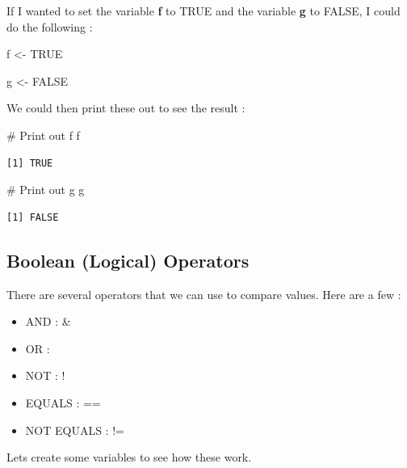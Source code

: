 \documentclass[
  letterpaper,
  DIV=11,
  numbers=noendperiod]{scrreprt}
\newenvironment{Shaded}{\begin{snugshade}}{\end{snugshade}}
\newcommand{\CommentTok}[1]{\textcolor[rgb]{0.37,0.37,0.37}{#1}}
\newcommand{\ConstantTok}[1]{\textcolor[rgb]{0.56,0.35,0.01}{#1}}
\newcommand{\NormalTok}[1]{\textcolor[rgb]{0.00,0.23,0.31}{#1}}
\newcommand{\OtherTok}[1]{\textcolor[rgb]{0.00,0.23,0.31}{#1}}
\providecommand{\tightlist}{%
  \setlength{\itemsep}{0pt}\setlength{\parskip}{0pt}}\usepackage{longtable,booktabs,array}
\begin{document}
If I wanted to set the variable \textbf{f} to TRUE and the variable
\textbf{g} to FALSE, I could do the following :

\begin{Shaded}
\begin{Highlighting}[]
\NormalTok{f }\OtherTok{\textless{}{-}} \ConstantTok{TRUE}

\NormalTok{g }\OtherTok{\textless{}{-}} \ConstantTok{FALSE}
\end{Highlighting}
\end{Shaded}

We could then print these out to see the result :

\begin{Shaded}
\begin{Highlighting}[]
\CommentTok{\# Print out f}
\NormalTok{f}
\end{Highlighting}
\end{Shaded}

\begin{verbatim}
[1] TRUE
\end{verbatim}

\begin{Shaded}
\begin{Highlighting}[]
\CommentTok{\# Print out g}
\NormalTok{g}
\end{Highlighting}
\end{Shaded}

\begin{verbatim}
[1] FALSE
\end{verbatim}

\subsection*{Boolean (Logical)
Operators}\label{boolean-logical-operators}

There are several operators that we can use to compare values. Here are
a few :

\begin{itemize}
\tightlist
\item
  AND : \&
\item
  OR : \textbar{}
\item
  NOT : !
\item
  EQUALS : ==
\item
  NOT EQUALS : !=
\end{itemize}

Lets create some variables to see how these work.
\end{document}
